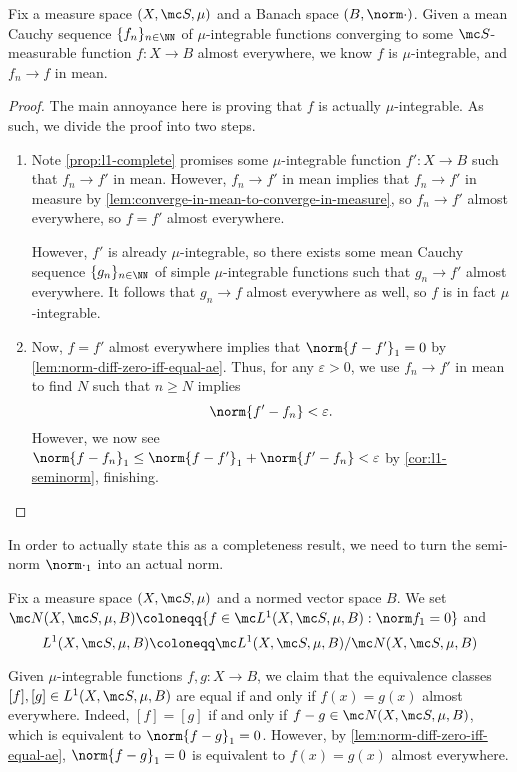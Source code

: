 \documentclass[../notes.tex]{subfiles}
\begin{document}
\begin{corollary} \label{cor:limit-of-mu-ints}
	Fix a measure space $(X,\mc S,\mu)$ and a Banach space $(B,\norm\cdot)$. Given a mean Cauchy sequence $\{f_n\}_{n\in\NN}$ of $\mu$-integrable functions converging to some $\mc S$-measurable function $f\colon X\to B$ almost everywhere, we know $f$ is $\mu$-integrable, and $f_n\to f$ in mean.
\end{corollary}
\begin{proof}
	The main annoyance here is proving that $f$ is actually $\mu$-integrable. As such, we divide the proof into two steps.
	\begin{enumerate}
		\item Note \autoref{prop:l1-complete} promises some $\mu$-integrable function $f'\colon X\to B$ such that $f_n\to f'$ in mean. However, $f_n\to f'$ in mean implies that $f_n\to f'$ in measure by \autoref{lem:converge-in-mean-to-converge-in-measure}, so $f_n\to f'$ almost everywhere, so $f=f'$ almost everywhere.

		However, $f'$ is already $\mu$-integrable, so there exists some mean Cauchy sequence $\{g_n\}_{n\in\NN}$ of simple $\mu$-integrable functions such that $g_n\to f'$ almost everywhere. It follows that $g_n\to f$ almost everywhere as well, so $f$ is in fact $\mu$-integrable.

		\item Now, $f=f'$ almost everywhere implies that $\norm{f-f'}_1=0$ by \autoref{lem:norm-diff-zero-iff-equal-ae}. Thus, for any $\varepsilon>0$, we use $f_n\to f'$ in mean to find $N$ such that $n\ge N$ implies
		\[\norm{f'-f_n}<\varepsilon.\]
		However, we now see $\norm{f-f_n}_1\le\norm{f-f'}_1+\norm{f'-f_n}<\varepsilon$ by \autoref{cor:l1-seminorm}, finishing.
		\qedhere
	\end{enumerate}
\end{proof}
In order to actually state this as a completeness result, we need to turn the semi-norm $\norm\cdot_1$ into an actual norm.
\begin{notation}
	Fix a measure space $(X,\mc S,\mu)$ and a normed vector space $B$. We set $\mc N(X,\mc S,\mu,B)\coloneqq\{f\in\mc L^1(X,\mc S,\mu,B):\norm f_1=0\}$ and
	\[L^1(X,\mc S,\mu,B)\coloneqq\mc L^1(X,\mc S,\mu,B)/\mc N(X,\mc S,\mu,B)\]
\end{notation}
\begin{remark}
	Given $\mu$-integrable functions $f,g\colon X\to B$, we claim that the equivalence classes $[f],[g]\in L^1(X,\mc S,\mu,B)$ are equal if and only if $f(x)=g(x)$ almost everywhere. Indeed, $[f]=[g]$ if and only if $f-g\in\mc N(X,\mc S,\mu,B)$, which is equivalent to $\norm{f-g}_1=0$. However, by \autoref{lem:norm-diff-zero-iff-equal-ae}, $\norm{f-g}_1=0$ is equivalent to $f(x)=g(x)$ almost everywhere.
\end{remark}
\end{document}
